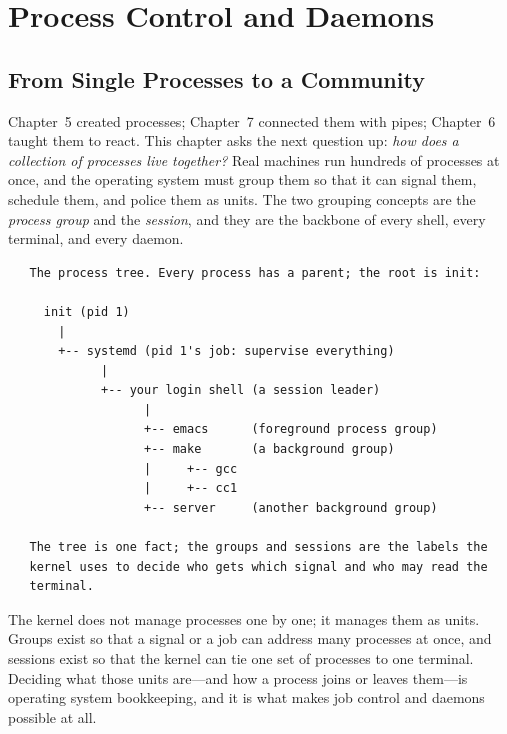 
\chapter{Process Control and Daemons}

\section{From Single Processes to a Community}

Chapter~5 created processes; Chapter~7 connected them with pipes;
Chapter~6 taught them to react. This chapter asks the next question
up: \emph{how does a collection of processes live together?} Real
machines run hundreds of processes at once, and the operating system
must group them so that it can signal them, schedule them, and police
them as units. The two grouping concepts are the \emph{process group}
and the \emph{session}, and they are the backbone of every shell,
every terminal, and every daemon.

\begin{verbatim}
   The process tree. Every process has a parent; the root is init:

     init (pid 1)
       |
       +-- systemd (pid 1's job: supervise everything)
             |
             +-- your login shell (a session leader)
                   |
                   +-- emacs      (foreground process group)
                   +-- make       (a background group)
                   |     +-- gcc
                   |     +-- cc1
                   +-- server     (another background group)

   The tree is one fact; the groups and sessions are the labels the
   kernel uses to decide who gets which signal and who may read the
   terminal.
\end{verbatim}

\begin{osconcept}
The kernel does not manage processes one by one; it manages them as
units. Groups exist so that a signal or a job can address many
processes at once, and sessions exist so that the kernel can tie one
set of processes to one terminal. Deciding what those units are---and
how a process joins or leaves them---is operating system bookkeeping,
and it is what makes job control and daemons possible at all.
\end{osconcept}

